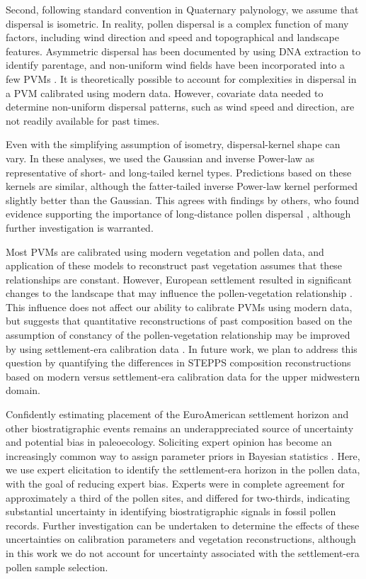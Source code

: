 \documentclass[12pt]{article}
\begin{document}
Second, following standard convention in Quaternary palynology, we
assume that dispersal is isometric. In reality, pollen dispersal is a
complex function of many factors, including wind direction and speed
and topographical and landscape features. Asymmetric dispersal has
been documented by \citet{robledo2005patterns} using DNA extraction to
identify parentage, and non-uniform wind fields have been incorporated
into a few PVMs \citep{bunting2005modelling}. It is theoretically
possible to account for complexities in dispersal in a PVM calibrated
using modern data. However, covariate data needed to determine
non-uniform dispersal patterns, such as wind speed and direction, are
not readily available for past times.

Even with the simplifying assumption of isometry, dispersal-kernel
shape can vary. In these analyses, we used the Gaussian and inverse
Power-law as representative of short- and long-tailed kernel
types. Predictions based on these kernels are similar, although the
fatter-tailed inverse Power-law kernel performed slightly better than
the Gaussian. This agrees with findings by others, who found evidence
supporting the importance of long-distance pollen dispersal
\citep{austerlitz2004using, macinnis2012measuring}, although further
investigation is warranted.

Most PVMs are calibrated using modern vegetation and pollen data, and
application of these models to reconstruct past vegetation assumes
that these relationships are constant. However, European settlement
resulted in significant changes to the landscape that may influence
the pollen-vegetation relationship \citep{kujawa2015,
  st2014bias}. This influence does not affect our ability to calibrate
PVMs using modern data, but suggests that quantitative reconstructions
of past composition based on the assumption of constancy of the
pollen-vegetation relationship may be improved by using settlement-era
calibration data \citep{kujawa2015}. In future work, we plan to
address this question by quantifying the differences in STEPPS
composition reconstructions based on modern versus settlement-era
calibration data for the upper midwestern domain.

Confidently estimating placement of the EuroAmerican settlement
horizon and other biostratigraphic events remains an underappreciated
source of uncertainty and potential bias in paleoecology. Soliciting
expert opinion has become an increasingly common way to assign
parameter priors in Bayesian statistics
\citep{choy2009elicitation}. Here, we use expert elicitation to
identify the settlement-era horizon in the pollen data, with the goal
of reducing expert bias. Experts were in complete agreement for
approximately a third of the pollen sites, and differed for
two-thirds, indicating substantial uncertainty in identifying
biostratigraphic signals in fossil pollen records. Further
investigation can be undertaken to determine the effects of these
uncertainties on calibration parameters and vegetation
reconstructions, although in this work we do not account for
uncertainty associated with the settlement-era pollen sample
selection.
\end{document}
